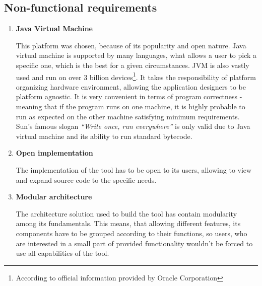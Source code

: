 \subsection{Non-functional requirements}
\begin{enumerate}
\item \textbf{Java Virtual Machine}

This platform was chosen, because of its popularity and open nature. Java virtual machine is supported by many languages, what allows a user to pick a specific one, which is the best for a given circumstances. JVM is also vastly used and run on over 3 billion devices\footnote{According to official information provided by Oracle Corporation}. It takes the responsibility of platform organizing hardware environment, allowing the application designers to be platform agnostic. It is very convenient in terms of program correctness - meaning that if the program runs on one machine, it is highly probable to run as expected on the other machine satisfying minimum requirements. Sun's famous slogan \textit{``Write once, run everywhere''} is only valid due to Java virtual machine and its ability to run standard bytecode.
\medbreak

\item \textbf{Open implementation}

The implementation of the tool has to be open to its users, allowing to view and expand source code to the specific needs. 
\medbreak

\item \label{nfreq:modul}\textbf{Modular architecture}

The architecture solution used to build the tool has contain modularity among its fundamentals. This means, that allowing different features, its components have to be grouped according to their functions, so users, who are interested in a small part of provided functionality wouldn't be forced to use all capabilities of the tool.

\end{enumerate}

